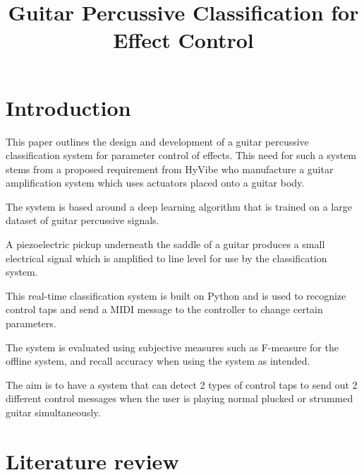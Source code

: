 \documentclass[conference]{IEEEtran}
\begin{document}
\title{Guitar Percussive Classification for Effect Control\\

}

\author{
}

\maketitle

\begin{abstract}

\end{abstract}
 
\section{Introduction}
This paper outlines the design and development of a guitar percussive classification system for parameter control of effects. This need for such a system stems from a proposed
requirement from HyVibe who manufacture a guitar amplification system which uses actuators placed onto a guitar body.

The system is based around a deep learning algorithm that is trained on a large dataset of guitar percussive signals. 

A piezoelectric pickup underneath the saddle of a guitar produces a small electrical signal which is amplified to line level for use by the classification system.

This real-time classification system is built on Python and is used to recognize control taps and send a MIDI message to the controller to change certain parameters.

The system is evaluated using subjective measures such as F-measure for the offline system, and recall accuracy when using the system as intended.

The aim is to have a system that can detect 2 types of control taps to send out 2 different control messages when the user is playing normal plucked or strummed guitar simultaneously.

\section{Literature review}
\end{document}
